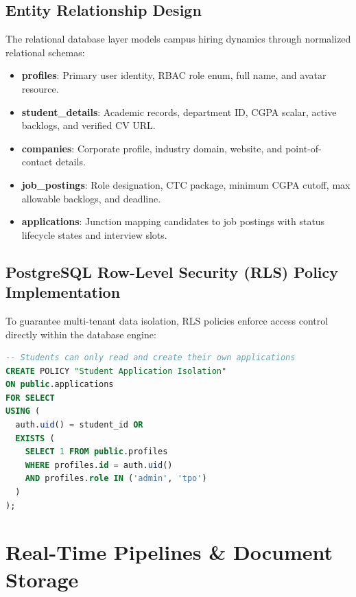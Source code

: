 \documentclass[12pt,a4paper]{report}
\begin{document}
\section{Entity Relationship Design}
The relational database layer models campus hiring dynamics through normalized relational schemas:
\begin{itemize}[nosep]
    \item \textbf{profiles}: Primary user identity, RBAC role enum, full name, and avatar resource.
    \item \textbf{student\_details}: Academic records, department ID, CGPA scalar, active backlogs, and verified CV URL.
    \item \textbf{companies}: Corporate profile, industry domain, website, and point-of-contact details.
    \item \textbf{job\_postings}: Role designation, CTC package, minimum CGPA cutoff, max allowable backlogs, and deadline.
    \item \textbf{applications}: Junction mapping candidates to job postings with status lifecycle states and interview slots.
\end{itemize}

\section{PostgreSQL Row-Level Security (RLS) Policy Implementation}
To guarantee multi-tenant data isolation, RLS policies enforce access control directly within the database engine:

\begin{lstlisting}[language=SQL,caption={Supabase PostgreSQL RLS Policy for Student Applications}]
-- Students can only read and create their own applications
CREATE POLICY "Student Application Isolation" 
ON public.applications
FOR SELECT 
USING (
  auth.uid() = student_id OR 
  EXISTS (
    SELECT 1 FROM public.profiles 
    WHERE profiles.id = auth.uid() 
    AND profiles.role IN ('admin', 'tpo')
  )
);
\end{lstlisting}

\chapter{Real-Time Pipelines \& Document Storage}
\end{document}
